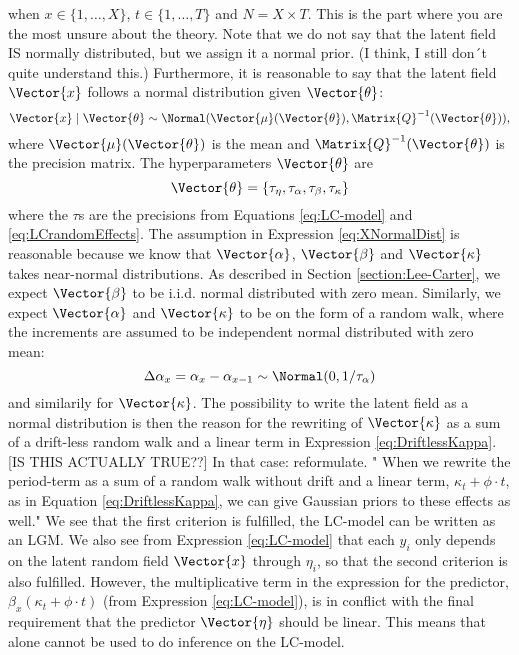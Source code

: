 when $x\in \{1,\ldots,X\}$, $t\in\{1,\ldots,T\}$ and $N=X\times T$. \textcolor{myDarkGreen}{This is the part where you are the most unsure about the theory. Note that we do not say that the latent field IS normally distributed, but we assign it a normal prior. (I think, I still don´t quite understand this.)}
Furthermore, it is reasonable to say that the latent field $\Vector{x}$ follows a normal distribution given $\Vector{\theta}$:
\begin{equation}
        \Vector{x}\mid \Vector{\theta} \sim \Normal(\Vector{\mu}(\Vector{\theta}), \Matrix{Q}^{-1}(\Vector{\theta})),
        \label{eq:XNormalDist}
\end{equation}
where $\Vector{\mu}(\Vector{\theta})$ is the mean and $\Matrix{Q}^{-1}(\Vector{\theta})$ is the precision matrix. The hyperparameters $\Vector{\theta}$ are
\begin{equation}
    \Vector{\theta} = \{\tau_{\eta}, \tau_{\alpha}, \tau_{\beta}, \tau_{\kappa}\}
    \label{eq:LChyperparams}
\end{equation}
where the $\tau$s are the precisions from Equations \ref{eq:LC-model} and \ref{eq:LCrandomEffects}. The assumption in Expression \ref{eq:XNormalDist} is reasonable because we know that $\Vector{\alpha}$, $\Vector{\beta}$ and $\Vector{\kappa}$ takes near-normal distributions. As described in Section \ref{section:Lee-Carter}, we expect $\Vector{\beta}$ to be i.i.d. normal distributed with zero mean. Similarly, we expect $\Vector{\alpha}$ and $\Vector{\kappa}$ to be on the form of a random walk, where the increments are assumed to be independent normal distributed with zero mean: 
\begin{equation*}
    \Delta \alpha_x = \alpha_x - \alpha_{x-1} \sim \Normal(0, 1/\tau_{\alpha})
\end{equation*}
and similarily for $\Vector{\kappa}$. The possibility to write the latent field as a normal distribution is then the reason for the rewriting of $\Vector{\kappa}$ as a sum of a drift-less random walk and a linear term in Expression \ref{eq:DriftlessKappa}.\textcolor{myDarkGreen}{[IS THIS ACTUALLY TRUE??] In that case: reformulate. " When we rewrite the period-term as a sum of a random walk without drift and a linear term, $\kappa_t + \phi\cdot t$, as in Equation \ref{eq:DriftlessKappa}, we can give Gaussian priors to these effects as well."} 
\newline
We see that the first criterion is fulfilled, the LC-model can be written as an LGM. We also see from Expression \ref{eq:LC-model} that each $y_i$ only depends on the latent random field $\Vector{x}$ through $\eta_i$, so that the second criterion is also fulfilled. However, the multiplicative term in the expression for the predictor, $\beta_x(\kappa_t + \phi\cdot t)$ (from Expression \ref{eq:LC-model}), is in conflict with the final requirement that the predictor $\Vector{\eta}$ should be linear. This means that \inla alone cannot be used to do inference on the LC-model. 
